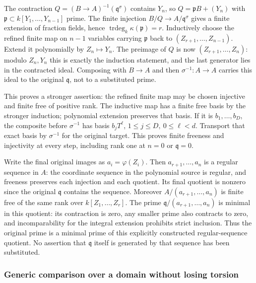 The contraction \(Q=(B\to A)^{-1}(\mathfrak q^\sigma)\) contains \(Y_n\), so \(Q=\mathfrak pB+(Y_n)\) with \(\mathfrak p\subset k[Y_1,\ldots,Y_{n-1}]\) prime. The finite injection \(B/Q\to A/\mathfrak q^\sigma\) gives a finite extension of fraction fields, hence \(\operatorname{trdeg}_k\kappa(\mathfrak p)=r\). Inductively choose the refined finite map on \(n-1\) variables carrying \(\mathfrak p\) back to \((Z_{r+1},\ldots,Z_{n-1})\). Extend it polynomially by \(Z_n\mapsto Y_n\). The preimage of \(Q\) is now \((Z_{r+1},\ldots,Z_n)\): modulo \(Z_n,Y_n\) this is exactly the induction statement, and the last generator lies in the contracted ideal. Composing with \(B\to A\) and then \(\sigma^{-1}:A\to A\) carries this ideal to the original \(\mathfrak q\), not to a substituted prime.

This proves a stronger assertion: the refined finite map may be chosen injective and finite free of positive rank. The inductive map has a finite free basis by the stronger induction; polynomial extension preserves that basis. If it is \(b_1,\ldots,b_D\), the composite before \(\sigma^{-1}\) has basis \(b_jT^\ell\), \(1\leq j\leq D,\ 0\leq\ell<d\). Transport that exact basis by \(\sigma^{-1}\) for the original target. This proves finite freeness and injectivity at every step, including rank one at \(n=0\) or \(\mathfrak q=0\).

Write the final original images as \(a_i=\varphi(Z_i)\). Then \(a_{r+1},\ldots,a_n\) is a regular sequence in \(A\): the coordinate sequence in the polynomial source is regular, and freeness preserves each injection and each quotient. Its final quotient is nonzero since the original \(\mathfrak q\) contains the sequence. Moreover \(A/(a_{r+1},\ldots,a_n)\) is finite free of the same rank over \(k[Z_1,\ldots,Z_r]\). The prime \(\mathfrak q/(a_{r+1},\ldots,a_n)\) is minimal in this quotient: its contraction is zero, any smaller prime also contracts to zero, and incomparability for the integral extension prohibits strict inclusion. Thus the original prime is a minimal prime of this explicitly constructed regular-sequence quotient. No assertion that \(\mathfrak q\) itself is generated by that sequence has been substituted.

\subsubsection{Generic comparison over a domain without losing torsion}\label{algebra-proof-026-generic-comparison-over-a-domain-without-losing-torsion}

